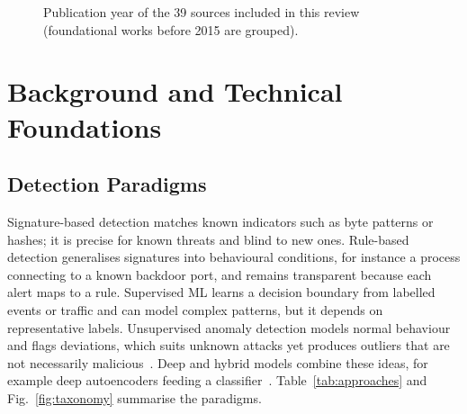 \documentclass[conference]{IEEEtran}
\begin{document}
\begin{figure}[t]
\centering
\caption{Publication year of the 39 sources included in this review (foundational works before 2015 are grouped).}
\label{fig:years}
\end{figure}

\section{Background and Technical Foundations}
\subsection{Detection Paradigms}
Signature-based detection matches known indicators such as byte patterns or hashes; it is precise for known threats and blind to new ones. Rule-based detection generalises signatures into behavioural conditions, for instance a process connecting to a known backdoor port, and remains transparent because each alert maps to a rule. Supervised ML learns a decision boundary from labelled events or traffic and can model complex patterns, but it depends on representative labels. Unsupervised anomaly detection models normal behaviour and flags deviations, which suits unknown attacks yet produces outliers that are not necessarily malicious~\cite{sommer2010outside}. Deep and hybrid models combine these ideas, for example deep autoencoders feeding a classifier~\cite{shone2018deep}. Table~\ref{tab:approaches} and Fig.~\ref{fig:taxonomy} summarise the paradigms.
\end{document}
